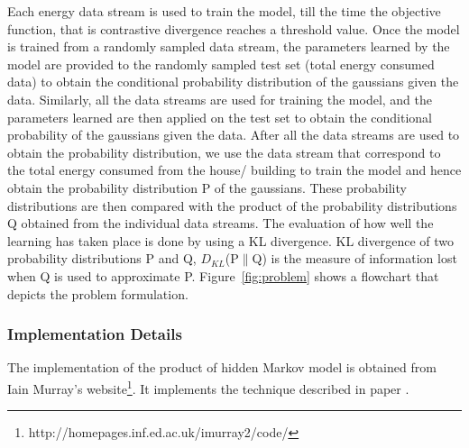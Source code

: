 \documentclass{acm_proc_article-sp}
\begin{document}
Each energy data stream is used to train the model, till the time the objective function, that is contrastive divergence reaches a threshold value. Once the model is trained from a randomly sampled data stream, the parameters learned by the model %
are provided to the randomly sampled test set (total energy consumed data) to obtain the conditional probability distribution of the gaussians given the data. Similarly, all the data streams are used for training the model, and the parameters learned are then applied on the test set to obtain the conditional probability of the gaussians given the data. After all the data streams are used to obtain the probability distribution, we use the data stream that correspond to the total energy consumed from the house/ building to train the model and hence obtain the probability distribution P of the gaussians. These probability distributions are then compared with the product of the probability distributions Q obtained from the individual data streams. The evaluation of how well the learning has taken place is done by using a KL divergence. KL divergence of two probability distributions P and Q, $D_{KL}$(P$\parallel$Q) is the measure of information lost when Q is used to approximate P. Figure~\ref{fig:problem} shows a flowchart that depicts the problem formulation.

\subsubsection{Implementation Details}
The implementation of the product of hidden Markov model is obtained from Iain Murray's website\footnote{\label{link}http://homepages.inf.ed.ac.uk/imurray2/code/}. It implements the technique described in paper \cite{hinton2000}.
\end{document}
